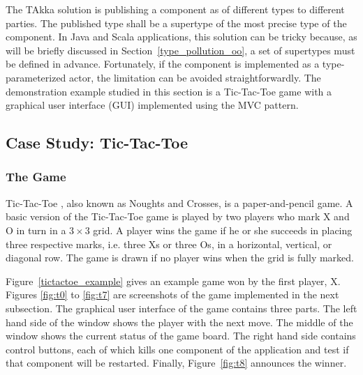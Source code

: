 The TAkka solution is publishing a component as of different types to different 
parties.  The published type shall be a supertype of the most precise type of 
the component.  In Java and Scala applications, this solution can be tricky 
because, as will be briefly discussed in Section~\ref{type_pollution_oo}, a set 
of supertypes must be defined in advance.  
Fortunately, if the component is implemented as a type-parameterized actor, 
the limitation can be avoided straightforwardly.  The demonstration example 
studied in this section is a Tic-Tac-Toe game with a graphical user interface 
(GUI) implemented using the MVC pattern.


\subsection{Case Study: Tic-Tac-Toe}


\subsubsection{The Game}

Tic-Tac-Toe \citep{wiki:tictactoe}, also known as Noughts and Crosses, is a 
paper-and-pencil game.  A basic version of the Tic-Tac-Toe game is played by 
two players who mark X and O in turn in a $3\times3$ grid.  A player wins the 
game if he or she succeeds in placing three respective marks, i.e. three Xs or three Os, in a 
horizontal, vertical, or diagonal row.  The game is drawn if no player wins when 
the grid is fully marked.

Figure~\ref{tictactoe_example} gives an example game won by the first player, 
X.  Figures \ref{fig:t0} to \ref{fig:t7}  are screenshots 
of the game implemented in the next subsection.  The graphical user interface 
of the game contains three parts.  The left hand side of the window shows the 
player with the next move.  The middle of the window shows the current status of 
the game board.  The right hand side contains control buttons, each of which 
kills one component of the application and test if that component will be 
restarted.  Finally, Figure~\ref{fig:t8} announces the winner.


